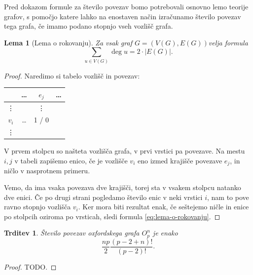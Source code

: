 \documentclass[11pt,a4paper]{article}
\theoremstyle{definition} %
\theoremstyle{plain} %
\newtheorem{lema}[definicija]{Lema}
\newtheorem{trditev}[definicija]{Trditev}
\newcommand{\graf}[1][G]{\ensuremath{#1 = (V(#1), E(#1))}}
\DeclareMathOperator {\stopnja} {deg}
\begin{document}
Pred dokazom formule za število povezav bomo potrebovali osnovno lemo teorije grafov, s pomočjo katere lahko na enostaven način izračunamo število povezav tega grafa, če imamo podano stopnjo vseh vozlišč grafa.

\begin{lema}[Lema o rokovanju]
    \label{lema:rokovanje}
    Za vsak graf \graf velja formula
    \begin{equation}
    \sum_{u \in V(G)}\! \stopnja u = 2 \cdot |E(G)|.
    \label{eq:lema-o-rokovanju}
    \end{equation}
\end{lema}

\begin{proof}
    Naredimo si tabelo vozlišč in povezav:
    
    \begin{table}[h]
        \centering
        \begin{tabular}{c|ccc}
            & \ldots & $e_j$ & \ldots \\ \hline
            \vdots & & \vdots & \\
            $v_i$ & \ldots & 1 / 0 & \\
            \vdots & & &
        \end{tabular}
    \end{table}
    
    V prvem stolpcu so našteta vozlišča grafa, v prvi vrstici pa povezave. Na mestu $i,j$ v tabeli zapišemo enico, če je vozlišče $v_i$ eno izmed krajišče povezave $e_j$, in ničlo v nasprotnem primeru. 
    
    Vemo, da ima vsaka povezava dve krajišči, torej sta v vsakem stolpcu natanko dve enici. Če po drugi strani pogledamo število enic v neki vrstici $i$, nam to pove ravno stopnjo vozlišča $v_i$. Ker mora biti rezultat enak, če seštejemo ničle in enice po stolpcih oziroma po vrsticah, sledi formula \eqref{eq:lema-o-rokovanju}.
\end{proof}

\begin{trditev}
	Število povezav oxfordskega grafa $O^n_p$ je enako
	\[ \frac{np}{2} \frac{(p-2+n)!}{(p-2)!} .\]
\end{trditev}

\begin{proof}
	TODO.
\end{proof}
\end{document}
